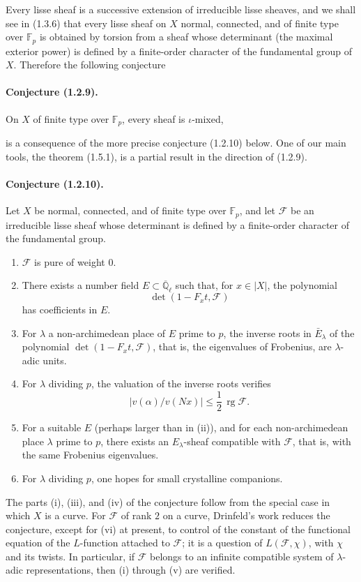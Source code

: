 \documentclass[11pt]{article}
\theoremstyle{remark}
\newcommand{\Qlb}{\overline{\mathbb{Q}}_\ell}
\newcommand{\Fp}{\mathbb{F}_p}
\newcommand{\rk}{\operatorname{rg}}
\begin{document}
Every lisse sheaf is a successive extension of irreducible lisse sheaves, and we shall see in (1.3.6) that every lisse sheaf on $X$ normal, connected, and of finite type over $\Fp$ is obtained by torsion from a sheaf whose determinant (the maximal exterior power) is defined by a finite-order character of the fundamental group of $X$. Therefore the following conjecture

\paragraph{Conjecture (1.2.9).} On $X$ of finite type over $\Fp$, every sheaf is $\iota$-mixed,

is a consequence of the more precise conjecture (1.2.10) below. One of our main tools, the theorem (1.5.1), is a partial result in the direction of (1.2.9).

\paragraph{Conjecture (1.2.10).} Let $X$ be normal, connected, and of finite type over $\Fp$, and let $\mathcal F$ be an irreducible lisse sheaf whose determinant is defined by a finite-order character of the fundamental group.
\begin{enumerate}[label=(\roman*)]
\item $\mathcal F$ is pure of weight $0$.
\item There exists a number field $E\subset\Qlb$ such that, for $x\in |X|$, the polynomial
\[
\det(1-F_x t,\mathcal F)
\]
has coefficients in $E$.
\item For $\lambda$ a non-archimedean place of $E$ prime to $p$, the inverse roots in $\bar E_\lambda$ of the polynomial $\det(1-F_x t,\mathcal F)$, that is, the eigenvalues of Frobenius, are $\lambda$-adic units.
\item For $\lambda$ dividing $p$, the valuation of the inverse roots verifies
\[
|v(\alpha)/v(Nx)|\le \frac12\,\rk \mathcal F.
\]
\item For a suitable $E$ (perhaps larger than in (ii)), and for each non-archimedean place $\lambda$ prime to $p$, there exists an $E_\lambda$-sheaf compatible with $\mathcal F$, that is, with the same Frobenius eigenvalues.
\item For $\lambda$ dividing $p$, one hopes for small crystalline companions.
\end{enumerate}

The parts (i), (iii), and (iv) of the conjecture follow from the special case in which $X$ is a curve. For $\mathcal F$ of rank $2$ on a curve, Drinfeld's work reduces the conjecture, except for (vi) at present, to control of the constant of the functional equation of the $L$-function attached to $\mathcal F$; it is a question of $L(\mathcal F,\chi)$, with $\chi$ and its twists. In particular, if $\mathcal F$ belongs to an infinite compatible system of $\lambda$-adic representations, then (i) through (v) are verified.
\end{document}
